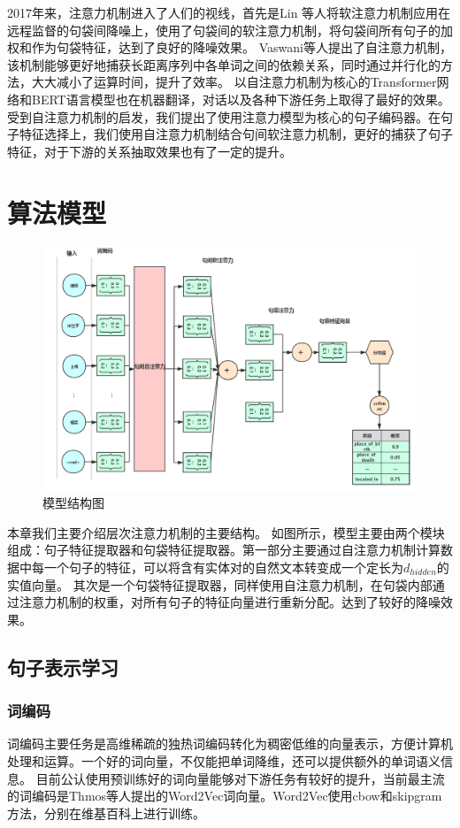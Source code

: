 \documentclass[UTF8]{csoarticle}
\begin{document}
2017年来，注意力机制进入了人们的视线，首先是Lin \cite{bib5}等人将软注意力机制应用在远程监督的句袋间降噪上，使用了句袋间的软注意力机制，将句袋间所有句子的加权和作为句袋特征，达到了良好的降噪效果。
Vaswani\cite{bib6}等人提出了自注意力机制，该机制能够更好地捕获长距离序列中各单词之间的依赖关系，同时通过并行化的方法，大大减小了运算时间，提升了效率。
以自注意力机制为核心的Transformer网络和BERT语言模型也在机器翻译，对话以及各种下游任务上取得了最好的效果。
受到自注意力机制的启发，我们提出了使用注意力模型为核心的句子编码器。在句子特征选择上，我们使用自注意力机制结合句间软注意力机制，更好的捕获了句子特征，对于下游的关系抽取效果也有了一定的提升。
\section{算法模型}
\begin{figure}[ht]
    \centering
    \includegraphics[width=1 \textwidth]{structure.png}
    \caption{模型结构图}
    \label{fig:fig1}
    \end{figure}
本章我们主要介绍层次注意力机制的主要结构。
如图所示，模型主要由两个模块组成：句子特征提取器和句袋特征提取器。第一部分主要通过自注意力机制计算数据中每一个句子的特征，可以将含有实体对的自然文本转变成一个定长为$d_{hidden}$的实值向量。
其次是一个句袋特征提取器，同样使用自注意力机制，在句袋内部通过注意力机制的权重，对所有句子的特征向量进行重新分配。达到了较好的降噪效果。
\subsection{句子表示学习}
\subsubsection{词编码}
词编码主要任务是高维稀疏的独热词编码转化为稠密低维的向量表示，方便计算机处理和运算。一个好的词向量，不仅能把单词降维，还可以提供额外的单词语义信息。
目前公认使用预训练好的词向量能够对下游任务有较好的提升，当前最主流的词编码是Thmos\cite{bib7}等人提出的Word2Vec词向量。Word2Vec使用cbow和skipgram方法，分别在维基百科上进行训练。
\end{document}
